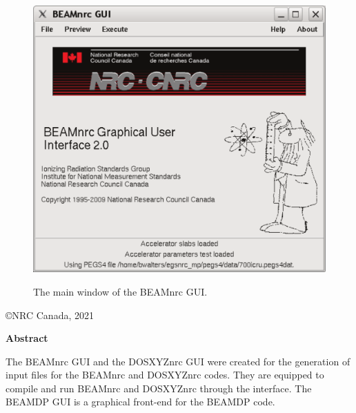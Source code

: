 \documentclass[12pt,twoside]{article}
\begin{document}
\begin{figure}[htbp]
\begin{center}
\leavevmode
\includegraphics[width=14cm]{figures/gui_main_window}

The main window of the BEAMnrc GUI.
\end{center}
\end{figure}


\vfill
\begin{center}
\copyright NRC Canada, 2021
\end{center}

\setlength{\baselineskip}{0.5cm}

\newpage

\begin{center}
\begin{Large}
{\bf Abstract}
\end{Large}
\end{center}
The BEAMnrc GUI and the DOSXYZnrc GUI were created
for the generation of input files for the BEAMnrc and DOSXYZnrc codes.
They are equipped to compile and run BEAMnrc and DOSXYZnrc through the
interface.  The
BEAMDP GUI is a graphical front-end for the BEAMDP code.
\end{document}
